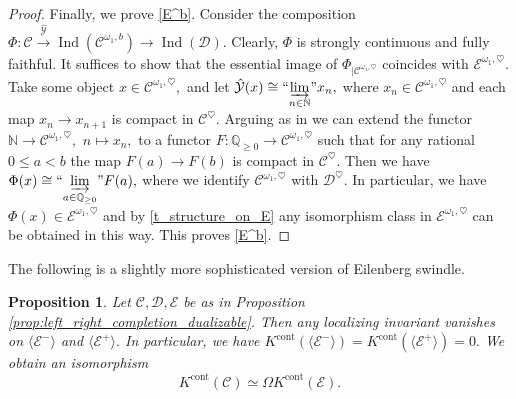 \documentclass[11pt,leqno]{amsart}
\newtheorem{prop}[theo]{Proposition}
\numberwithin{equation}{section}
\def\N{\mathbb{N}}
\def\Q{\mathbb{Q}}
\newcommand{\indlim}[1][]{\mathop{\varinjlim}\limits_{#1}}
\newcommand{\inddlim}[1][]{{``{\indlim[#1]}"}}
\newcommand{\xto}{\xrightarrow}
\newcommand{\cont}{\operatorname{cont}}
\newcommand{\cD}{{\mathcal D}}
\newcommand{\cC}{{\mathcal C}}
\newcommand{\cE}{{\mathcal E}}
\newcommand{\cY}{{\mathcal Y}}
\newcommand{\la}{\langle}
\newcommand{\ra}{\rangle}
\newcommand{\Ind}{\operatorname{Ind}}
\begin{document}
\begin{proof}
Finally, we prove \ref{E^b}. Consider the composition $\Phi:\cC\xto{\hat{\cY}}\Ind(\cC^{\omega_1,b})\to \Ind(\cD).$ Clearly, $\Phi$ is strongly continuous and fully faithful. It suffices to show that the essential image of $\Phi_{\mid \cC^{\omega_1,\heartsuit}}$ coincides with $\cE^{\omega_1,\heartsuit}.$ Take some object $x\in\cC^{\omega_1,\heartsuit},$ and let $\hat{\cY}(x)\cong\inddlim[n\in\N] x_n,$ where $x_n\in\cC^{\omega_1,\heartsuit}$ and each map $x_n\to x_{n+1}$ is compact in $\cC^{\heartsuit}.$ Arguing as in \cite[Proof of Proposition 1.82]{E24} we can extend the functor $\N\to \cC^{\omega_1,\heartsuit},$ $n\mapsto x_n,$ to a functor $F:\Q_{\geq 0}\to \cC^{\omega_1,\heartsuit}$ such that for any rational $0\leq a<b$ the map $F(a)\to F(b)$ is compact in $\cC^{\heartsuit}.$ Then we have $\Phi(x)\cong \inddlim[a\in\Q_{\geq 0}]F(a),$ where we identify $\cC^{\omega_1,\heartsuit}$ with $\cD^{\heartsuit}.$ In particular, we have $\Phi(x)\in\cE^{\omega_1,\heartsuit}$ and by \ref{t_structure_on_E} any isomorphism class in $\cE^{\omega_1,\heartsuit}$ can be obtained in this way. This proves \ref{E^b}.
\end{proof}

The following is a slightly more sophisticated version of Eilenberg swindle.

\begin{prop}\label{prop:Eilenberg_swindle_E^-_E^+}
Let $\cC,\cD,\cE$ be as in Proposition \ref{prop:left_right_completion_dualizable}. Then any localizing invariant vanishes on $\la \cE^-\ra$ and $\la \cE^+\ra.$ In particular, we have $K^{\cont}(\la \cE^-\ra) = K^{\cont}(\la \cE^+\ra) = 0.$ We obtain an isomorphism
\begin{equation}\label{eq:suspension_for_K_theory_of_t_categories}
K^{\cont}(\cC)\simeq \Omega K^{\cont}(\cE).
\end{equation}
\end{prop}
\end{document}
